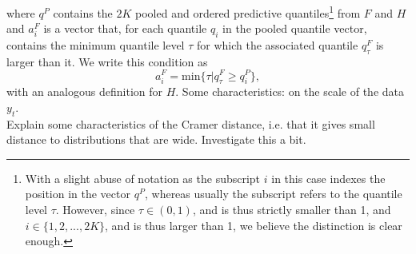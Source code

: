 where $q^P$ contains the $2K$ pooled and ordered predictive quantiles\footnote{With a slight abuse of notation as the subscript $i$ in this case indexes the position in the vector $q^P$, whereas usually the subscript refers to the quantile level $\tau$. However, since $\tau \in (0,1)$, and is thus strictly smaller than 1, and $i \in \{1,2,...,2K\}$, and is thus larger than 1, we believe the distinction is clear enough.} from $F$ and $H$ and $a_i^F$ is a vector that, for each quantile $q_i$ in the pooled quantile vector, contains the minimum quantile level $\tau$ for which the associated quantile $q_\tau^F$ is larger than it. We write this condition as
\begin{equation*}
a_i^F = \text{min}\{\tau | q_\tau^F \geq q_i^P\},
\end{equation*}
with an analogous definition for $H$.
Some characteristics: on the scale of the data $y_t$.\\
Explain some characteristics of the Cramer distance, i.e. that it gives small distance to distributions that are wide. Investigate this a bit.\\
